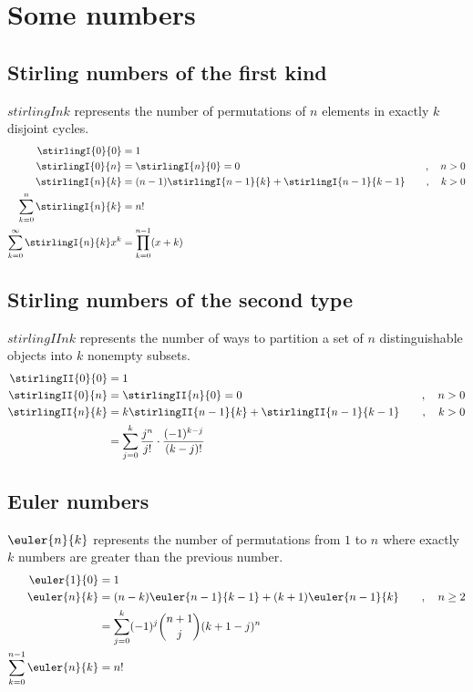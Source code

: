 \section{Some numbers}
\subsection{Stirling numbers of the first kind}
    $stirlingI{n}{k}$ represents the number of permutations of $n$ elements in exactly $k$ disjoint cycles.
    \begin{align*}
        \stirlingI{0}{0} &= 1 \\
        \stirlingI{0}{n} &= \stirlingI{n}{0} = 0 \quad &, \quad n>0 \\
        \stirlingI{n}{k} &= (n-1)\stirlingI{n-1}{k} + \stirlingI{n-1}{k-1} \quad &, \quad k>0 \\
        \sum_{k=0}^{n} \stirlingI{n}{k} &= n! \\
        \sum_{k=0}^{\infty} \stirlingI{n}{k} x^k &= \prod_{k=0}^{n-1}(x+k)
    \end{align*}

\subsection{Stirling numbers of the second type}
    $stirlingII{n}{k}$ represents the number of ways to partition a set of $n$ distinguishable objects into $k$ nonempty subsets.
    \begin{align*}
        \stirlingII{0}{0} &= 1 \\
        \stirlingII{0}{n} &= \stirlingII{n}{0} = 0 \quad &, \quad n>0 \\
        \stirlingII{n}{k} &= k\stirlingII{n-1}{k} + \stirlingII{n-1}{k-1} \quad &, \quad k>0 \\
        &= \sum_{j=0}^{k} \dfrac{j^n}{j!} \cdot \dfrac{(-1)^{k-j}}{(k-j)!}
    \end{align*}

    \subsection{Euler numbers}
    $\euler{n}{k}$ represents the number of permutations from $1$ to $n$ where exactly $k$ numbers are greater than the previous number.
    \begin{align*}
        \euler{1}{0} &= 1 \\
        \euler{n}{k} &= (n-k)\euler{n-1}{k-1} + (k+1)\euler{n-1}{k} \quad &, \quad n \geq 2 \\
        &= \sum_{j=0}^{k} (-1)^j \binom{n+1}{j} (k+1-j)^n \\
        \sum_{k=0}^{n-1} \euler{n}{k} &= n!
    \end{align*}


